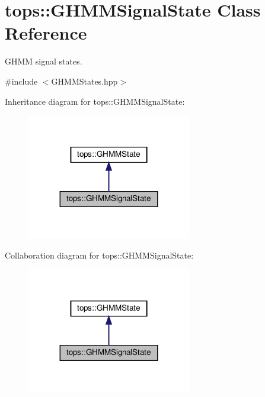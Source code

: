 \hypertarget{classtops_1_1GHMMSignalState}{}\section{tops\+:\+:G\+H\+M\+M\+Signal\+State Class Reference}
\label{classtops_1_1GHMMSignalState}


G\+H\+MM signal states.  




{\ttfamily \#include $<$G\+H\+M\+M\+States.\+hpp$>$}



Inheritance diagram for tops\+:\+:G\+H\+M\+M\+Signal\+State\+:
\nopagebreak
\begin{figure}[H]
\begin{center}
\leavevmode
\includegraphics[width=203pt]{classtops_1_1GHMMSignalState__inherit__graph}
\end{center}
\end{figure}


Collaboration diagram for tops\+:\+:G\+H\+M\+M\+Signal\+State\+:
\nopagebreak
\begin{figure}[H]
\begin{center}
\leavevmode
\includegraphics[width=203pt]{classtops_1_1GHMMSignalState__coll__graph}
\end{center}
\end{figure}
